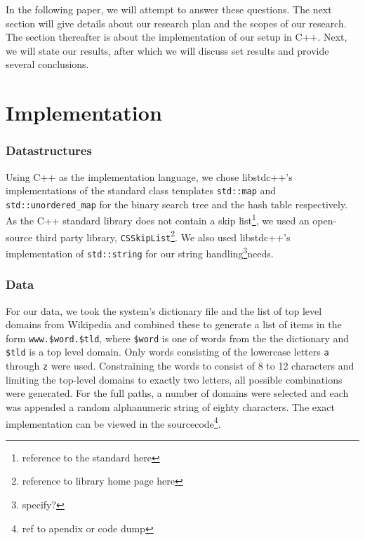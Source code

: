 \documentclass[12pt,a4paper]{article}
\begin{document}
    In the following paper, we will attempt to answer these questions. The next section will give details
    about our research plan and the scopes of our research. The section thereafter is about the implementation
    of our setup in C++. Next, we will state our results, after which we will discuss set results and provide
    several conclusions.    
    \section{Implementation}
    \subsubsection*{Datastructures}

    Using C++ as the implementation language, we chose libstdc++'s implementations of the standard class
    templates \texttt{std::map} and \texttt{std::unordered\_map} for the binary search
    tree and the hash table respectively.  As the C++ standard library does not contain a skip
    list\footnote{reference to the standard here}, we used an open-source third party library,
    \texttt{CSSkipList}\footnote{reference to library home page here}.  We also used libstdc++'s
    implementation of \texttt{std::string} for our string handling\footnote{specify?}needs.
    
    \subsubsection*{Data}
    For our data, we took the system's dictionary file and the list of top level domains from Wikipedia
    and combined these to generate a list of items in the form \texttt{www.\$word.\$tld}, where
    \texttt{\$word} is one of words from the the dictionary and \texttt{\$tld} is a top level domain.  Only
    words consisting of the lowercase letters \texttt{a} through \texttt{z} were used.  Constraining the
    words to consist of 8 to 12 characters and limiting the top-level domains to exactly two letters, 
    all possible combinations were generated.  For the full paths, a number of domains were selected
    and each was appended a random alphanumeric string of eighty characters.  The exact implementation
    can be viewed in the sourcecode\footnote{ref to apendix or code dump}.
\end{document}
